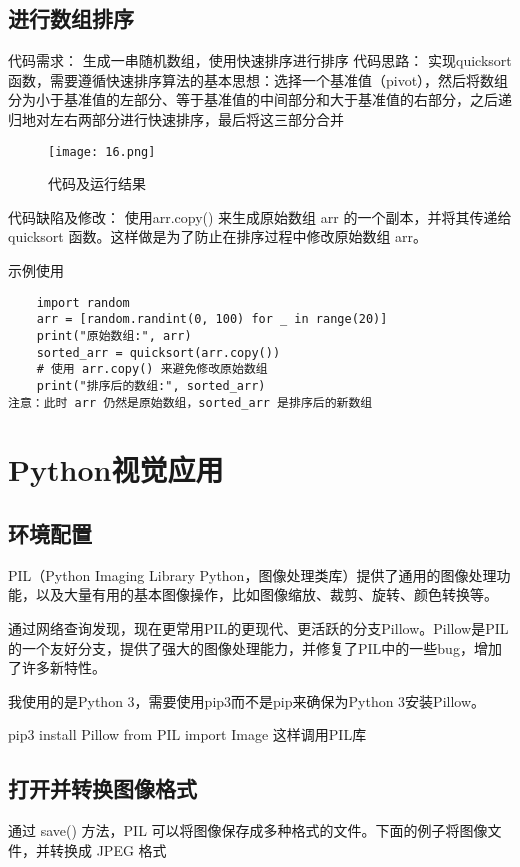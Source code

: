 \documentclass[a4paper, 12pt]{article}
\begin{document}
\subsection{进行数组排序}
代码需求：
生成一串随机数组，使用快速排序进行排序
代码思路：
实现quicksort 函数，需要遵循快速排序算法的基本思想：选择一个基准值（pivot），然后将数组分为小于基准值的左部分、等于基准值的中间部分和大于基准值的右部分，之后递归地对左右两部分进行快速排序，最后将这三部分合并

\begin{figure}[H]
  \centering
    \texttt{[image: 16.png]}
  \caption{代码及运行结果}
   \end{figure}  

 代码缺陷及修改：
   使用arr.copy() 来生成原始数组 arr 的一个副本，并将其传递给 quicksort 函数。这样做是为了防止在排序过程中修改原始数组 arr。

示例使用  
\begin{lstlisting}
    import random  
    arr = [random.randint(0, 100) for _ in range(20)]  
    print("原始数组:", arr)  
    sorted_arr = quicksort(arr.copy()) 
    # 使用 arr.copy() 来避免修改原始数组  
    print("排序后的数组:", sorted_arr)  
注意：此时 arr 仍然是原始数组，sorted_arr 是排序后的新数组

\end{lstlisting}
    


\section{Python视觉应用}


\subsection{环境配置}
PIL（Python Imaging Library Python，图像处理类库）提供了通用的图像处理功能，以及大量有用的基本图像操作，比如图像缩放、裁剪、旋转、颜色转换等。

通过网络查询发现，现在更常用PIL的更现代、更活跃的分支Pillow。Pillow是PIL的一个友好分支，提供了强大的图像处理能力，并修复了PIL中的一些bug，增加了许多新特性。

我使用的是Python 3，需要使用pip3而不是pip来确保为Python 3安装Pillow。

pip3 install Pillow
from PIL import Image  这样调用PIL库

\subsection{打开并转换图像格式}
通过 save() 方法，PIL 可以将图像保存成多种格式的文件。下面的例子将图像文件，并转换成 JPEG 格式
\end{document}
